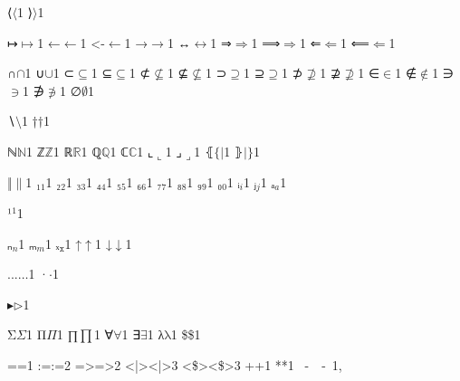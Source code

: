 {%
{⟨}{{\ensuremath{\langle}}}1
{⟩}{{\ensuremath{\rangle}}}1

{↦}{{\ensuremath{\mapsto}}}1
{←}{{\ensuremath{\leftarrow}}}1
{<-}{{\ensuremath{\leftarrow}}}1
{→}{{\ensuremath{\rightarrow}}}1
{↔}{{\ensuremath{\leftrightarrow}}}1
{⇒}{{\ensuremath{\Rightarrow}}}1
{⟹}{{\ensuremath{\Longrightarrow}}}1
{⇐}{{\ensuremath{\Leftarrow}}}1
{⟸}{{\ensuremath{\Longleftarrow}}}1

{∩}{{\ensuremath{\cap}}}1
{∪}{{\ensuremath{\cup}}}1
{⊂}{{\ensuremath{\subseteq}}}1
{⊆}{{\ensuremath{\subseteq}}}1
{⊄}{{\ensuremath{\nsubseteq}}}1
{⊈}{{\ensuremath{\nsubseteq}}}1
{⊃}{{\ensuremath{\supseteq}}}1
{⊇}{{\ensuremath{\supseteq}}}1
{⊅}{{\ensuremath{\nsupseteq}}}1
{⊉}{{\ensuremath{\nsupseteq}}}1
{∈}{{\ensuremath{\in}}}1
{∉}{{\ensuremath{\notin}}}1
{∋}{{\ensuremath{\ni}}}1
{∌}{{\ensuremath{\notni}}}1
{∅}{{\ensuremath{\emptyset}}}1

{∖}{{\ensuremath{\setminus}}}1
{†}{{\ensuremath{\dag}}}1

{ℕ}{{\ensuremath{\mathbb{N}}}}1
{ℤ}{{\ensuremath{\mathbb{Z}}}}1
{ℝ}{{\ensuremath{\mathbb{R}}}}1
{ℚ}{{\ensuremath{\mathbb{Q}}}}1
{ℂ}{{\ensuremath{\mathbb{C}}}}1
{⌞}{{\ensuremath{\llcorner}}}1
{⌟}{{\ensuremath{\lrcorner}}}1
{⦃}{{\ensuremath{\{\!|}}}1
{⦄}{{\ensuremath{|\!\}}}}1

{‖}{{\ensuremath{\|}}}1
{₁}{{\ensuremath{_1}}}1
{₂}{{\ensuremath{_2}}}1
{₃}{{\ensuremath{_3}}}1
{₄}{{\ensuremath{_4}}}1
{₅}{{\ensuremath{_5}}}1
{₆}{{\ensuremath{_6}}}1
{₇}{{\ensuremath{_7}}}1
{₈}{{\ensuremath{_8}}}1
{₉}{{\ensuremath{_9}}}1
{₀}{{\ensuremath{_0}}}1
{ᵢ}{{\ensuremath{_i}}}1
{ⱼ}{{\ensuremath{_j}}}1
{ₐ}{{\ensuremath{_a}}}1

{¹}{{\ensuremath{^1}}}1

{ₙ}{{\ensuremath{_n}}}1
{ₘ}{{\ensuremath{_m}}}1
{ₓ}{{\ensuremath{_{\mathtt{x}}}}}1
{↑}{{\ensuremath{\uparrow}}}1
{↓}{{\ensuremath{\downarrow}}}1

{...}{{\ensuremath{\ldots}}}1
{·}{{\ensuremath{\cdot}}}1

{▸}{{\ensuremath{\triangleright}}}1

{Σ}{{\color{symbolcolor}\ensuremath{\Sigma}}}1
{Π}{{\color{symbolcolor}\ensuremath{\Pi}}}1
{∏}{{\color{symbolcolor}\ensuremath{\prod}}}1
{∀}{{\color{symbolcolor}\ensuremath{\forall}}}1
{∃}{{\color{symbolcolor}\ensuremath{\exists}}}1
{λ}{{\color{symbolcolor}\ensuremath{\mathrm{\lambda}}}}1
{\$}{{\color{symbolcolor}\$}}1

{=}{{\color{symbolcolor}=}}1
{:=}{{\color{symbolcolor}:=}}2
{=>}{{\color{symbolcolor}=>}}2
{<|>}{{\color{symbolcolor}<|>}}3
{<\$>}{{\color{symbolcolor}<\$>}}3
{+}{{\color{symbolcolor}+}}1
{*}{{\color{symbolcolor}*}}1
{\ -\ }{{\color{symbolcolor}\ -\ }}1,

}
